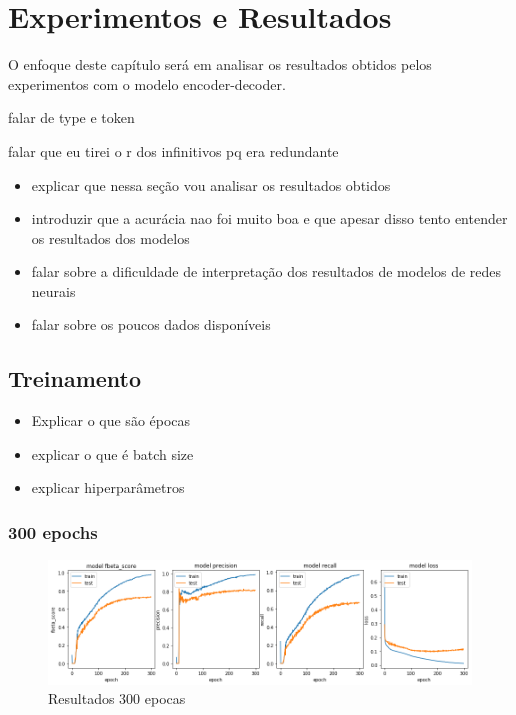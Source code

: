 \chapter{Experimentos e Resultados}
\label{ch:07}

O enfoque deste capítulo será em analisar os resultados obtidos pelos experimentos com o modelo encoder-decoder.

falar de type e token

falar que eu tirei o r dos infinitivos pq era redundante

\begin{itemize}
    \item explicar que nessa seção vou analisar os resultados obtidos
    \item introduzir que a acurácia nao foi muito boa e que apesar disso tento entender os resultados dos modelos
    \item falar sobre a dificuldade de interpretação dos resultados de modelos de redes neurais
    \item falar sobre os poucos dados disponíveis%
\end{itemize}

\section{Treinamento}

\begin{itemize}
    \item Explicar o que são épocas
    \item explicar o que é batch size
    \item explicar hiperparâmetros
\end{itemize}
\subsection{300 epochs}
\begin{figure}[H]
  \centering
  \includegraphics[width=1.0\linewidth]{img/300_fbeta.png}
  \caption{Resultados 300 epocas}
  \label{fig:training}
\end{figure}

